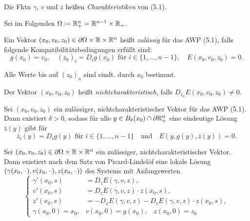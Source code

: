 \documentclass{cheat-sheet}
\begin{document}
\begin{defn}
  Die Fktn $\gamma$, $v$ und $z$ heißen \emph{Charakteristiken} von (5.1).
\end{defn}

\begin{nota}
  Sei im Folgenden $\Omega \coloneqq \mathbb{R}^n_{+} = \mathbb{R}^{n-1} \times \mathbb{R}_{+}$.
\end{nota}

\begin{defn}
  Ein Vektor $(x_0, v_0, z_0) \in \partial \Omega \times \mathbb{R} \times \mathbb{R}^n$ heißt \emph{zulässig} für das AWP (5.1), falls folgende Kompatibilitätsbedingungen erfüllt sind:
  \[
    g(x_0) = v_0, \quad
    (z_0)_i = D_i g(x_0) \text{ für } i \in \{ 1, ..., n{-}1 \}, \quad
    E(x_0, v_0, z_0) = 0.
  \]
\end{defn}

\begin{bem}
  Alle Werte bis auf $(z_0)_n$ sind eindt. durch $x_0$ bestimmt.
\end{bem}

\begin{defn}
  Der Vektor $(x_0, v_0, z_0)$ heißt \emph{nichtcharakteristisch}, falls $D_{z_n} E(x_0, v_0, z_0) \not= 0$.
\end{defn}

\begin{lem}
  Sei $(x_0, v_0, z_0)$ ein zulässiger, nichtcharakteristischer Vektor für das AWP (5.1). Dann existiert $\delta > 0$, sodass für alle $y \in B_{\delta}(x_0) \cap \partial \mathbb{R}^n_{+}$ eine eindeutige Lösung $\overline{z}(y)$ gibt für
  \[
    \overline{z_i}(y) = D_i g(y) \text{ für } i \in \{ 1, ..., n{-}1 \}
    \quad \text{und} \quad
    E(y, g(y), \overline{z}(y)) = 0.
  \]
\end{lem}

\begin{bem}
  Sei $(x_0, v_0, z_0) \in \partial \Omega \times \mathbb{R} \times \mathbb{R}^n$ ein zulässiger, nichtcharakteristischer Vektor. Dann existiert nach dem Satz von Picard-Lindelöf eine lokale Lösung $(\gamma(x_0, \text{--}), v(x_0, \text{--}), z(x_0, \text{--}))$ des Systems mit Anfangswerten
  \[
    \left\{ \begin{array}{rl}
      \gamma'(x_0, s) & = D_z E(\gamma, v, z), \\
      v'(x_0, s) & = D_z E(\gamma, v, z) \cdot z(x_0, s), \\
      z'(x_0, s) & = - D_x E(\gamma, v, z) - D_v E(\gamma, v, z) \cdot z(x_0, s), \\
      \gamma(x_0, 0) = x_0, & v(x_0, 0) = g(x_0), \enspace\,\, z(x_0, 0) = z_0
    \end{array} \right.
  \]
\end{bem}
\end{document}
